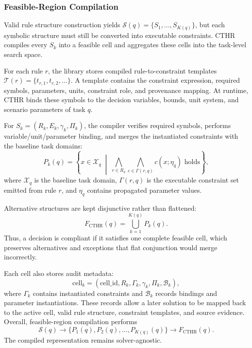﻿\documentclass[a4paper,fleqn]{cas-dc}
\begin{document}
\subsubsection{Feasible-Region Compilation}
\label{sec:feasible_region_compilation}

Valid rule structure construction yields $\mathcal{S}(q)=\{S_1,\ldots,S_{K(q)}\}$, but each symbolic structure must still be converted into executable constraints. CTHR compiles every $S_k$ into a feasible cell and aggregates these cells into the task-level search space.

For each rule $r$, the library stores compiled rule-to-constraint templates $\mathcal{T}(r)=\{t_{r,1},t_{r,2},\ldots\}$. A template contains the constraint expression, required symbols, parameters, units, constraint role, and provenance mapping. At runtime, CTHR binds these symbols to the decision variables, bounds, unit system, and scenario parameters of task $q$.

For $S_k=(R_k,E_k,\gamma_k,\Pi_k)$, the compiler verifies required symbols, performs variable/unit/parameter binding, and merges the instantiated constraints with the baseline task domains:
\begin{equation}
P_k(q) = \left\{ x \in \mathcal{X}_q \;\middle|\; \bigwedge_{r \in R_k} \bigwedge_{c \in \Gamma(r,q)} c(x;\eta_q) \text{ holds} \right\},
\end{equation}
where $\mathcal{X}_q$ is the baseline task domain, $\Gamma(r,q)$ is the executable constraint set emitted from rule $r$, and $\eta_q$ contains propagated parameter values.

Alternative structures are kept disjunctive rather than flattened:
\begin{equation}
F_{\mathrm{CTHR}}(q) = \bigcup_{k=1}^{K(q)} P_k(q).
\label{eq:fcthr}
\end{equation}
Thus, a decision is compliant if it satisfies one complete feasible cell, which preserves alternatives and exceptions that flat conjunction would merge incorrectly.

Each cell also stores audit metadata:
\begin{equation}
\mathrm{cell}_k = (\mathrm{cell\_id}, R_k, \Gamma_k, \gamma_k, \Pi_k, \mathcal{B}_k),
\end{equation}
where $\Gamma_k$ contains instantiated constraints and $\mathcal{B}_k$ records bindings and parameter instantiations. These records allow a later solution to be mapped back to the active cell, valid rule structure, constraint templates, and source evidence. Overall, feasible-region compilation performs
\begin{equation}
\mathcal{S}(q) \longrightarrow \{P_1(q), P_2(q), \ldots, P_{K(q)}(q)\} \longrightarrow F_{\mathrm{CTHR}}(q).
\end{equation}
The compiled representation remains solver-agnostic.
\end{document}
